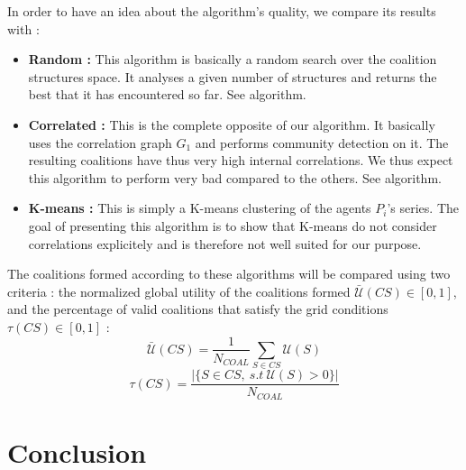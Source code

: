\documentclass[conference]{IEEEtran}
\begin{document}
In order to have an idea about the algorithm's quality, we compare its results with :
\begin{itemize}
\item \textbf{Random :} This algorithm is basically a random search over the coalition structures space. It analyses a given number of structures and returns the best that it has encountered so far. See algorithm.
\item \textbf{Correlated :} This is the complete opposite of our algorithm. It basically uses the correlation graph $ G_{1} $ and performs community detection on it. The resulting coalitions have thus very high internal correlations. We thus expect this algorithm to perform very bad compared to the others. See algorithm.
\item \textbf{K-means :} This is simply a K-means clustering of the agents $ P_{i} $'s series. The goal of presenting this algorithm is to show that K-means do not consider correlations explicitely and is therefore not well suited for our purpose.
\end{itemize} 

The coalitions formed according to these algorithms will be compared using two criteria : the normalized global utility of the coalitions formed $ \bar{\mathcal{U}}(CS) \in [0,1] $, and the percentage of valid coalitions that satisfy the grid conditions $ \tau(CS) \in [0,1] $ :
\begin{equation}
	\bar{\mathcal{U}}(CS) = \dfrac{1}{N_{COAL}} \sum_{S \in CS} \mathcal{U}(S)
\end{equation}
\begin{equation}
	\tau(CS) = \dfrac{|\{ S \in CS,\ s.t\ \mathcal{U}(S) > 0 \}|}{N_{COAL}}
\end{equation}


%
%
\section{Conclusion}
\label{sec:conclusion}


%
%
 
  

\end{document}

